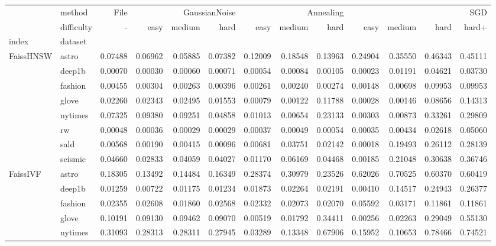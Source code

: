 \begin{tabular}{llrrrrrrrrrrr}
\toprule
 & method & File & \multicolumn{3}{r}{GaussianNoise} & \multicolumn{3}{r}{Annealing} & \multicolumn{4}{r}{SGD} \\
 & difficulty & - & easy & medium & hard & easy & medium & hard & easy & medium & hard & hard+ \\
index & dataset &  &  &  &  &  &  &  &  &  &  &  \\
\midrule
\multirow[t]{8}{*}{FaissHNSW} & astro & 0.07488 & 0.06962 & 0.05885 & 0.07382 & 0.12009 & 0.18548 & 0.13963 & 0.24904 & 0.35550 & 0.46343 & 0.45111 \\
 & deep1b & 0.00070 & 0.00030 & 0.00060 & 0.00071 & 0.00054 & 0.00084 & 0.00105 & 0.00023 & 0.01191 & 0.04621 & 0.03730 \\
 & fashion & 0.00455 & 0.00304 & 0.00263 & 0.00396 & 0.00261 & 0.00240 & 0.00274 & 0.00148 & 0.00698 & 0.09953 & 0.09953 \\
 & glove & 0.02260 & 0.02343 & 0.02495 & 0.01553 & 0.00079 & 0.00122 & 0.11788 & 0.00028 & 0.00146 & 0.08656 & 0.14313 \\
 & nytimes & 0.07325 & 0.09380 & 0.09251 & 0.04858 & 0.01013 & 0.00654 & 0.23133 & 0.00303 & 0.00873 & 0.33261 & 0.29809 \\
 & rw & 0.00048 & 0.00036 & 0.00029 & 0.00029 & 0.00037 & 0.00049 & 0.00054 & 0.00035 & 0.00434 & 0.02618 & 0.05060 \\
 & sald & 0.00568 & 0.00190 & 0.00415 & 0.00096 & 0.00681 & 0.03751 & 0.02142 & 0.00018 & 0.19493 & 0.26112 & 0.28139 \\
 & seismic & 0.04660 & 0.02833 & 0.04059 & 0.04027 & 0.01170 & 0.06169 & 0.04468 & 0.00185 & 0.21048 & 0.30638 & 0.36746 \\
\cline{1-13}
\multirow[t]{8}{*}{FaissIVF} & astro & 0.18305 & 0.13492 & 0.14484 & 0.16349 & 0.28374 & 0.30979 & 0.23526 & 0.62026 & 0.70525 & 0.60370 & 0.60419 \\
 & deep1b & 0.01259 & 0.00722 & 0.01175 & 0.01234 & 0.01873 & 0.02264 & 0.02191 & 0.00410 & 0.14517 & 0.24943 & 0.26377 \\
 & fashion & 0.02355 & 0.02608 & 0.01860 & 0.02568 & 0.02332 & 0.02073 & 0.02070 & 0.05592 & 0.03171 & 0.11861 & 0.11861 \\
 & glove & 0.10191 & 0.09130 & 0.09462 & 0.09070 & 0.00519 & 0.01792 & 0.34411 & 0.00256 & 0.02263 & 0.29049 & 0.55130 \\
 & nytimes & 0.31093 & 0.28313 & 0.28311 & 0.27945 & 0.03289 & 0.13348 & 0.67906 & 0.15952 & 0.10653 & 0.78466 & 0.74521 \\

\end{tabular}
